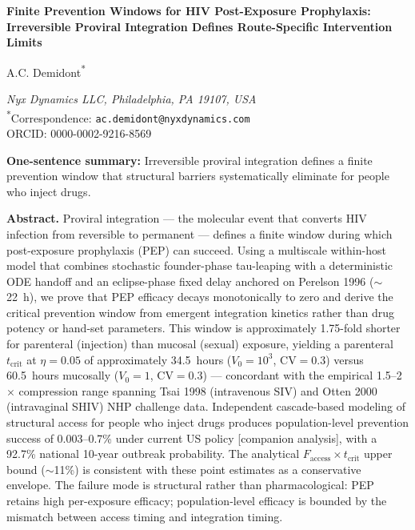\documentclass[11pt]{article}
\theoremstyle{definition}
\theoremstyle{remark}
\newcommand{\Faccess}{F_{\text{access}}}
\newcommand{\tcrit}{t_{\text{crit}}}
\begin{document}
\begin{flushleft}
{\LARGE\bfseries Finite Prevention Windows for HIV Post-Exposure Prophylaxis:\\[0.3em]
Irreversible Proviral Integration Defines Route-Specific Intervention Limits\par}
\vspace{1em}

{\large A.C. Demidont\textsuperscript{*}\par}
\vspace{0.5em}
\textit{Nyx Dynamics LLC, Philadelphia, PA 19107, USA}\\[0.3em]
\textsuperscript{*}Correspondence: \texttt{ac.demidont@nyxdynamics.com} \\
ORCID: 0000-0002-9216-8569
\end{flushleft}

\vspace{1em}

\noindent\textbf{One-sentence summary:} Irreversible proviral integration defines a finite prevention window that structural barriers systematically eliminate for people who inject drugs.

\vspace{1em}

\noindent\textbf{Abstract.}\quad
Proviral integration --- the molecular event that converts HIV infection from reversible to permanent --- defines a finite window during which post-exposure prophylaxis (PEP) can succeed. Using a multiscale within-host model that combines stochastic founder-phase tau-leaping with a deterministic ODE handoff and an eclipse-phase fixed delay anchored on Perelson 1996 ($\sim$22~h), we prove that PEP efficacy decays monotonically to zero and derive the critical prevention window from emergent integration kinetics rather than drug potency or hand-set parameters. This window is approximately 1.75-fold shorter for parenteral (injection) than mucosal (sexual) exposure, yielding a parenteral $\tcrit$ at $\eta = 0.05$ of approximately 34.5~hours ($V_{0} = 10^{3}$, CV$=0.3$) versus 60.5~hours mucosally ($V_{0} = 1$, CV$=0.3$) --- concordant with the empirical 1.5--2$\times$ compression range spanning Tsai 1998 (intravenous SIV) and Otten 2000 (intravaginal SHIV) NHP challenge data. Independent cascade-based modeling of structural access for people who inject drugs produces population-level prevention success of 0.003--0.7\% under current US policy [companion analysis], with a 92.7\% national 10-year outbreak probability. The analytical $\Faccess \times \tcrit$ upper bound ($\sim$11\%) is consistent with these point estimates as a conservative envelope. The failure mode is structural rather than pharmacological: PEP retains high per-exposure efficacy; population-level efficacy is bounded by the mismatch between access timing and integration timing.
\end{document}
